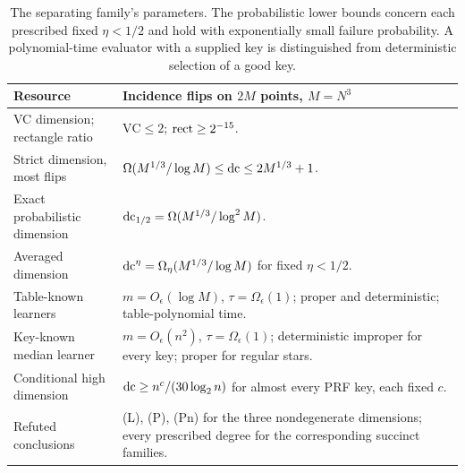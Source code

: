\begin{table}[t]
\centering\small
\begin{tabularx}{\linewidth}{@{}p{.30\linewidth}X@{}}
\toprule
Resource & Incidence flips on $2M$ points, $M=N^3$\\\midrule
VC dimension; rectangle ratio & $\mathrm{VC}\le2$; $\operatorname{rect}\ge2^{-15}$.\\
Strict dimension, most flips & $\Omega(M^{1/3}/\log M)\le\operatorname{dc}\le2M^{1/3}+1$.\\
Exact probabilistic dimension & $\operatorname{dc}_{1/2}=\Omega(M^{1/3}/\log^2M)$.\\
Averaged dimension & $\operatorname{dc}^\eta=\Omega_\eta(M^{1/3}/\log M)$ for fixed $\eta<1/2$.\\
Table-known learners & $m=O_\epsilon(\log M)$, $\tau=\Omega_\epsilon(1)$; proper and deterministic; table-polynomial time.\\
Key-known median learner & $m=O_\epsilon(n^2)$, $\tau=\Omega_\epsilon(1)$; deterministic improper for every key; proper for regular stars.\\
Conditional high dimension & $\operatorname{dc}\ge n^c/(30\log_2n)$ for almost every PRF key, each fixed $c$.\\
Refuted conclusions & (L), (P), (Pn) for the three nondegenerate dimensions; every prescribed degree for the corresponding succinct families.\\
\bottomrule
\end{tabularx}
\caption{The separating family's parameters. The probabilistic lower bounds concern each prescribed fixed $\eta<1/2$ and hold with exponentially small failure probability. A polynomial-time evaluator with a supplied key is distinguished from deterministic selection of a good key.}\label{tab:family}
\end{table}
